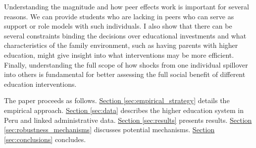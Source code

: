 







Understanding the magnitude and how peer effects work is important for several reasons. We can provide students who are lacking in peers who can serve as support or role models with such individuals. I also show that there can be several constraints binding the decisions over educational investments and what characteristics of the family environment, such as having parents with higher education, might give insight into what interventions may be more efficient. Finally, understanding the full scope of how shocks from one individual spillover into others is fundamental for better assessing the full social benefit of different education interventions. %

The paper proceeds as follows. \hyperref[sec:empirical_strategy]{Section \ref{sec:empirical_strategy}} details the empirical approach. \hyperref[sec:data]{Section \ref{sec:data}}  describes the higher education system in Peru and linked administrative data. \hyperref[sec:results]{Section \ref{sec:results}} presents results. \hyperref[sec:robustness_mechanisms]{Section \ref{sec:robustness_mechanisms}} discusses potential mechanisms. \hyperref[sec:conclusions]{Section \ref{sec:conclusions}} concludes.




